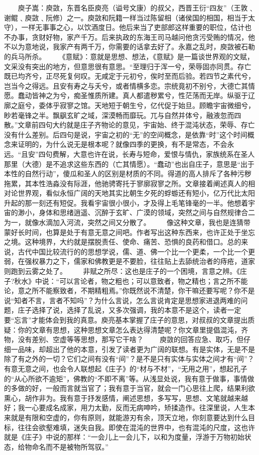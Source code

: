 \documentclass[]{book}
\begin{document}
　　庾子嵩：庾敳，东晋名臣庾亮（谥号文康）的叔父，西晋王衍``四友''（王敦﹑谢鲲﹑庾敳﹑阮修）之一。庾敳和阮籍一样当过陈留相（诸侯国的相国，相当于太守），一样无事事之心，以饮酒度日。他后来当了吏部郎这样重要的职位，估计也不办事，贪财好物，家产千万。后来执政的东海王司马越问他贪污受贿的情况，他不以为意地说，我家产有两千万，你需要的话拿去好了。永嘉之乱时，庾敳被石勒的兵马所杀。
　　《意赋》：意就是思想、想法，《意赋》是一篇谈世界观的文赋，文采没有突出的地方，但意思很有意思。``至理归于浑一兮，荣辱固亦同贯。存亡既已均齐兮，正尽死复何叹。无咸定于元初兮，俟时至而后验。若四节之素代兮，岂当今之得远。且安有寿之与夭兮，或者情横多恋。宗统竟初不别兮，大德亡其情愿。蠢动皆神之为兮，痴圣惟质所建。真人都遣秽累兮，性茫荡而无岸。纵驱于辽廓之庭兮，委体乎寂寥之馆。天地短于朝生兮，亿代促于始旦。顾瞻宇宙微细兮，眇若毫锋之半。飘飖玄旷之域，深漠畅而靡玩。兀与自然并体兮，融液忽而四散。''文章前四句大约就是庄子齐物论的意见，宇宙始、终于混沌状态，荣辱、存亡没有什么差别。后四句是说，宇宙之初的``无''的空间概念，是依靠``时''这个时间概念来证明的，为什么说无是根本呢？就像四季的更换，有不是常态，不会永远。``且安''四句费解，大意也许在说，长寿与短命，爱恨与情仇，家族统系在圣人那里（大德）是不追求这些东西的（亡其情愿）。``蠢动''也出自庄子，意思是``出于本性的自然行动''，傻瓜和圣人的区别是材质的不同。得道的高人排斥了各种污秽拖累，其本性浩淼没有际涯，他驰骋寄托于寥廓寂寥之所。文章接着阐述真人的相对论世界观，看似永恒广阔的天地其实比朝生夕死的蜉蝣还有短小，亿万代比太阳升起的那一刻还有短促。我看宇宙很小很小，才及得上毛笔锋毫的一半。他想着宇宙的渺小，身体和思绪逍遥、沉醉于玄旷、广漠的领域，突然之间与自然规律合二为一，就像水滴加入河流，突然之间又分散了。
　　像这种文章，我也是连猜带蒙好长时间，也算是处于有意无意之间吧。作者写出这种东西来，也许正处于坐忘之境。这种境界，大约就是摆脱责任、使命、痛苦、恐惧的良药和借口。总的来说，古代中国比较流行的的思想学说，儒、道、佛一个比一个更柔，一个比一个更弱，在强权暴力之下，儒家和佛教更是不要脸，往往贴上去舔统治者的痔疮，道家则跑到云雾之处了。
　　非赋之所尽：这也是庄子的一个困境，言意之辨。《庄子?秋水》中说：``可以言论者，物之粗也；可以意致者，物之精也；言之所不能论，意之所不能察致者，不期精粗焉。''你既然说不清楚，你干嘛还要写呢？你不是说``知者不言，言者不知吗''？为什么言说，怎么言说肯定是思想家进退两难的问题，庄子选择了说，选择了乱说，又多次强调，我的本意不是这个，读者一定要``忘言''才能体会到我的真意。庾亮基本掌握了庄子的意思，对叔叔的文章提出质疑：你的文章有思想，这种思想文章怎么表达得清楚呢？你文章里提倡混沌，齐物，没有差别、空虚等等思想，那写它干啥？
　　庾敳的回答应急、取巧，但仔细一品味，却超出了他的本意，引发了读者更为广阔的联想。有是实体，无是不是除了有之外的一切？它们之间有没有``间''？是不是只有实体与实体之间才有``间''？有意无意之间，也会令人联想起《庄子》的``材与不材''，``无用之用''，想起孔子的``从心所欲不逾矩''，佛教的``不即不离''等。从浅显处说，我有意于做事，事情做的多做的好，一般而言就当官了；我有意于当官，就会一门心思往上爬，结果利欲熏心，胡作非为。我有意于抒发感情，阐述思想，多写写，思想、文笔就越来越好；我一心要成名成家，用力太勤，反而无病呻吟，矫揉造作。往深里说，人生本来就是有限和空虚的，你有原则，就能游刃有余，顶天立地，你刻意要达到什么目标，往往会欲壑难填，迷失自我。即使在混沌的世界中，也有混沌的尺度，这也许就是《庄子》中说的那样：``一会儿上一会儿下，以和为度量，浮游于万物初始状态，给物命名而不是被物所驾驭。''
\end{document}
